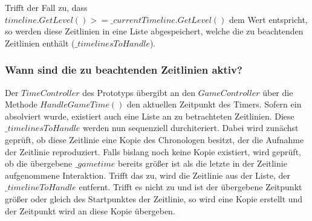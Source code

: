 Trifft der Fall zu, dass $timeline.GetLevel() >= \_currentTimeline.GetLevel()$ dem Wert  entspricht, so werden diese Zeitlinien in eine Liste abgespeichert, welche die zu beachtenden Zeitlinien enthält ($\_timelinesToHandle$).

\subsubsection{Wann sind die zu beachtenden Zeitlinien aktiv?}\label{sec:good_03}
Der $TimeController$ des Prototyps übergibt an den $GameController$ über die Methode $HandleGameTime()$ den aktuellen Zeitpunkt des Timers. Sofern ein  absolviert wurde, existiert auch eine Liste an zu betrachteten Zeitlinien. Diese $\_timelinesToHandle$ werden nun sequenziell durchiteriert. Dabei wird zunächst geprüft, ob diese Zeitlinie eine Kopie des Chronologen besitzt, der die Aufnahme der Zeitlinie reproduziert. Falls bislang noch keine Kopie existiert, wird geprüft, ob die übergebene $\_gametime$ bereits größer ist als die letzte in der Zeitlinie aufgenommene Interaktion. Trifft das zu, wird die Zeitlinie aus der Liste, der $\_timelineToHandle$ entfernt. Trifft es nicht zu und ist der übergebene Zeitpunkt größer oder gleich des Startpunktes der Zeitlinie, so wird eine Kopie erstellt und der Zeitpunkt wird an diese Kopie übergeben.

